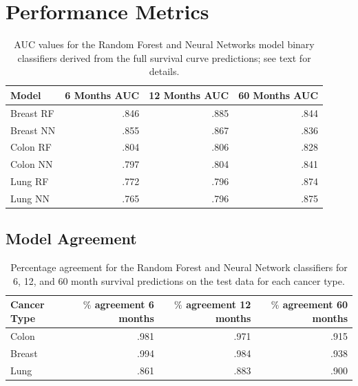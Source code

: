 \documentclass[a4paper,11pt]{article}
\begin{document}

\section{Performance Metrics}
\label{sec:performancemetrics}



\begin{table}[tbp]
\begin{center}
\begin{tabular}{|l|r|r|r|}
\hline
\rowcolors{1}{white}{yellow}
Model & 6 Months AUC & 12 Months AUC & 60 Months AUC \\ \hline
Breast RF &  .846       &     .885           &  .844 \\ \hline
Breast NN &   .855      &     .867      &    .836 \\ \hline
Colon RF  &     .804          &      .806           &      .828           \\ \hline
Colon NN   &     .797          &          .804         &   .841  \\ \hline
Lung RF    &      .772               &        .796               &   .874  \\ \hline
Lung NN    &        .765              &        .796               &  .875  \\
\hline
\end{tabular}
\caption{\label{tab:AUC} AUC values for the Random Forest and Neural Networks model
binary classifiers derived from the full survival curve predictions; see text for details.}
\end{center}
\end{table}


\subsection{Model Agreement}

\begin{table}[tbp]
\begin{center}
\begin{tabular}{|l|r|r|r|}
\hline
\rowcolors{1}{white}{yellow}
Cancer Type & $\%$ agreement 6 months & $\%$ agreement 12 months & $\%$ agreement 60 months \\ \hline
Colon & .981 & .971 & .915 \\  \hline
Breast & .994 & .984 & .938 \\  \hline
Lung & .861 & .883 & .900 \\  
\hline
\end{tabular}
\caption{\label{tab:agree} Percentage agreement for the Random Forest and Neural Network classifiers for 6, 12, and 60 month survival predictions on the test data for each cancer type.}
\end{center}
\end{table}
\end{document}
